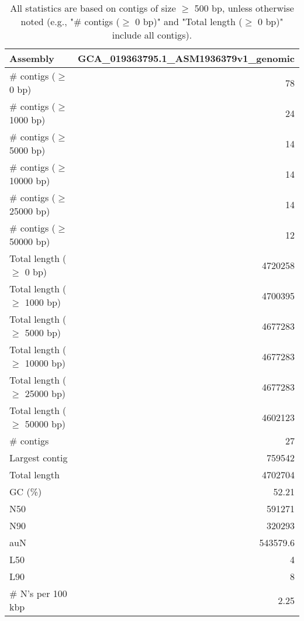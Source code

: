 \documentclass[12pt,a4paper]{article}
\begin{document}
\begin{table}[ht]
\begin{center}
\caption{All statistics are based on contigs of size $\geq$ 500 bp, unless otherwise noted (e.g., "\# contigs ($\geq$ 0 bp)" and "Total length ($\geq$ 0 bp)" include all contigs).}
\begin{tabular}{|l*{1}{|r}|}
\hline
Assembly & GCA\_019363795.1\_ASM1936379v1\_genomic \\ \hline
\# contigs ($\geq$ 0 bp) & 78 \\ \hline
\# contigs ($\geq$ 1000 bp) & 24 \\ \hline
\# contigs ($\geq$ 5000 bp) & 14 \\ \hline
\# contigs ($\geq$ 10000 bp) & 14 \\ \hline
\# contigs ($\geq$ 25000 bp) & 14 \\ \hline
\# contigs ($\geq$ 50000 bp) & 12 \\ \hline
Total length ($\geq$ 0 bp) & 4720258 \\ \hline
Total length ($\geq$ 1000 bp) & 4700395 \\ \hline
Total length ($\geq$ 5000 bp) & 4677283 \\ \hline
Total length ($\geq$ 10000 bp) & 4677283 \\ \hline
Total length ($\geq$ 25000 bp) & 4677283 \\ \hline
Total length ($\geq$ 50000 bp) & 4602123 \\ \hline
\# contigs & 27 \\ \hline
Largest contig & 759542 \\ \hline
Total length & 4702704 \\ \hline
GC (\%) & 52.21 \\ \hline
N50 & 591271 \\ \hline
N90 & 320293 \\ \hline
auN & 543579.6 \\ \hline
L50 & 4 \\ \hline
L90 & 8 \\ \hline
\# N's per 100 kbp & 2.25 \\ \hline
\end{tabular}
\end{center}
\end{table}
\end{document}
